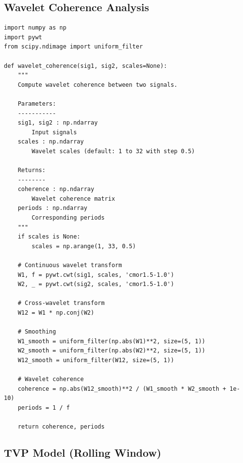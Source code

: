 \documentclass[12pt,a4paper,twocolumn]{article}
\begin{document}
\subsection{Wavelet Coherence Analysis}

\begin{lstlisting}[caption={Wavelet Coherence with PyWT}, label=lst:wavelet]
import numpy as np
import pywt
from scipy.ndimage import uniform_filter

def wavelet_coherence(sig1, sig2, scales=None):
    """
    Compute wavelet coherence between two signals.
    
    Parameters:
    -----------
    sig1, sig2 : np.ndarray
        Input signals
    scales : np.ndarray
        Wavelet scales (default: 1 to 32 with step 0.5)
    
    Returns:
    --------
    coherence : np.ndarray
        Wavelet coherence matrix
    periods : np.ndarray
        Corresponding periods
    """
    if scales is None:
        scales = np.arange(1, 33, 0.5)
    
    # Continuous wavelet transform
    W1, f = pywt.cwt(sig1, scales, 'cmor1.5-1.0')
    W2, _ = pywt.cwt(sig2, scales, 'cmor1.5-1.0')
    
    # Cross-wavelet transform
    W12 = W1 * np.conj(W2)
    
    # Smoothing
    W1_smooth = uniform_filter(np.abs(W1)**2, size=(5, 1))
    W2_smooth = uniform_filter(np.abs(W2)**2, size=(5, 1))
    W12_smooth = uniform_filter(W12, size=(5, 1))
    
    # Wavelet coherence
    coherence = np.abs(W12_smooth)**2 / (W1_smooth * W2_smooth + 1e-10)
    periods = 1 / f
    
    return coherence, periods
\end{lstlisting}

\subsection{TVP Model (Rolling Window)}
\end{document}
